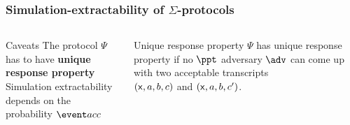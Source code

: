 \documentclass[aspectratio=169]{beamer}
\renewcommand{\emph}[1]{\textbf{#1}}
\begin{document}
\begin{frame}
  \frametitle{Simulation-extractability of $\Sigma$-protocols}
  \begin{center}{}
\end{center}
\begin{columns}
  \begin{column}{.4\linewidth}
  \begin{block}{Caveats}
    The protocol $\Psi$ has to have \emph{unique response property}\\
    Simulation extractability depends on the probability $\accProb$
  \end{block}
\end{column}
\begin{column}{.4\linewidth}
  \begin{block}{Unique response property}
    $\Psi$ has unique response property if no $\ppt$ adversary $\adv$ can come
    up with two acceptable transcripts\\
    $(\mathsf{x}, a, b, c)$ and $(\mathsf{x}, a, b, c')$.
  \end{block}
\end{column}
\end{columns}
\end{frame}
\end{document}
